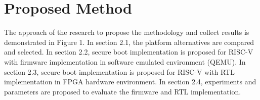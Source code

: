 \documentclass[a4paper,fleqn]{cas-dc}
\begin{document}
\section{ Proposed Method}
The approach of the research to propose the methodology and collect results is demonstrated in Figure 1. In section 2.1, the platform alternatives are compared and selected. In section 2.2, secure boot implementation is proposed for RISC-V with firmware implementation in software emulated environment (QEMU). In section 2.3, secure boot implementation is proposed for RISC-V with RTL implementation in FPGA hardware environment. In section 2.4, experiments and parameters are proposed to evaluate the firmware and RTL implementation.

\end{document}
